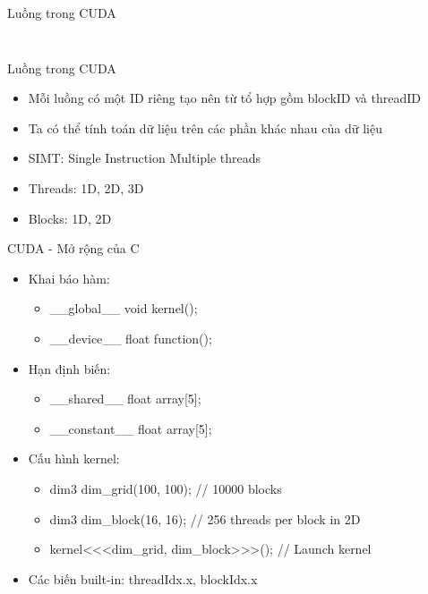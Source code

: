 \documentclass[10pt]{beamer}
\theoremstyle{remark}
\numberwithin{algocf}{section}
\numberwithin{equation}{section}
\numberwithin{dl}{section}
\numberwithin{figure}{section}
\begin{document}
\begin{frame}{Luồng trong CUDA}
\begin{columns}[onlytextwidth]
\begin{column}{0.5\linewidth}
\begin{figure}[H]
            \end{figure}
        \end{column}
    \end{columns}
\end{frame}

\begin{frame}{Luồng trong CUDA}
    \begin{itemize}
        \item Mỗi luồng có một ID riêng tạo nên từ tổ hợp gồm blockID và threadID
        \item Ta có thể tính toán dữ liệu trên các phần khác nhau của dữ liệu
        \item SIMT: Single Instruction Multiple threads
        \item Threads: 1D, 2D, 3D
        \item Blocks: 1D, 2D
    \end{itemize}
\end{frame}

\begin{frame}[shrink]{CUDA - Mở rộng của C}
    \begin{itemize}
        \item Khai báo hàm:
        \begin{itemize}
            \item \_\_global\_\_ void kernel();
            \item \_\_device\_\_ float function();
        \end{itemize}
        \item Hạn định biến:
        \begin{itemize}
            \item \_\_shared\_\_ float array[5];
            \item \_\_constant\_\_ float array[5];
        \end{itemize}
        \item Cấu hình kernel:
        \begin{itemize}
            \item dim3 dim\_grid(100, 100); // 10000 blocks
            \item dim3 dim\_block(16, 16); // 256 threads per block in 2D
            \item kernel<<<dim\_grid, dim\_block>>>(); // Launch kernel
        \end{itemize}
        \item Các biến built-in: threadIdx.x, blockIdx.x
    \end{itemize}
\end{frame}
\end{document}
